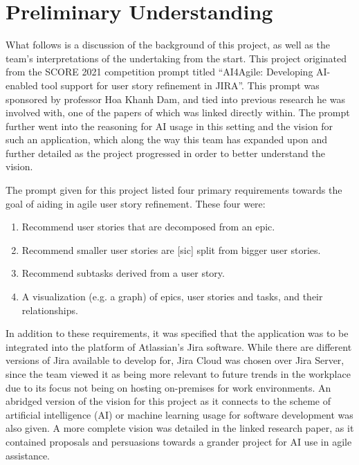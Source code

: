 \section{ Preliminary Understanding}
What follows is a discussion of the background of this project, as well as the team’s interpretations of the undertaking from the start. This project originated from the SCORE 2021 competition prompt titled “AI4Agile: Developing AI-enabled tool support for user story refinement in JIRA”. This prompt was sponsored by professor Hoa Khanh Dam, and tied into previous research he was involved with, one of the papers of which was linked directly within\cite{b1}. The prompt further went into the reasoning for AI usage in this setting and the vision for such an application, which along the way this team has expanded upon and further detailed as the project progressed in order to better understand the vision.

The prompt given for this project listed four primary requirements towards the goal of aiding in agile user story refinement. These four were:

\begin{enumerate}
	\item Recommend user stories that are decomposed from an epic.
	\item Recommend smaller user stories are [sic] split from bigger user stories.
	\item Recommend subtasks derived from a user story.
	\item A visualization (e.g. a graph) of epics, user stories and tasks, and their relationships.
\end{enumerate}

In addition to these requirements, it was specified that the application was to be integrated into the platform of Atlassian’s Jira software. While there are different versions of Jira available to develop for, Jira Cloud was chosen over Jira Server, since the team viewed it as being more relevant to future trends in the workplace due to its focus not being on hosting on-premises for work environments. An abridged version of the vision for this project as it connects to the scheme of artificial intelligence (AI) or machine learning usage for software development was also given. A more complete vision was detailed in the linked research paper, as it contained proposals and persuasions towards a grander project for AI use in agile assistance.  

